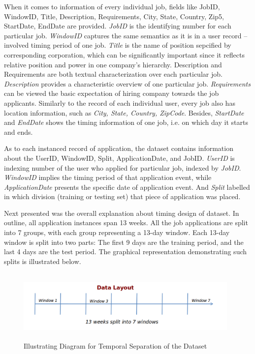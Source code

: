 \documentclass{article} %
\begin{document}
When it comes to information of every individual job, fields like JobID,
WindowID, Title, Description, Requirements, City, State, Country, Zip5,
StartDate, EndDate are provided.
{\it JobID} is the identifying number for each particular job. 
{\it WindowID} captures the same semantics as it is in a user record --
involved timing period of one job.
{\it Title} is the name of position sepcified by corresponding corporation, which
can be significantly important since it reflects relative position and power
in one company's hierarchy. 
Description and Requirements are both textual characterization
over each particular job. 
{\it Description} provides a
characteristic overview of one particular job. 
{\it Requirements} can be
viewed the basic expectation of hiring company towards the job applicants.
Similarly to the record of each individual user, every job also has location
information, such as {\it City, State, Country, ZipCode}. 
Besides, {\it StartDate} and {\it EndDate} shows the timing information of one job,
i.e. on which day it starts and ends. 

As to each instanced record of application, the dataset contains information
about the UserID, WindowID, Split, ApplicationDate, and JobID. 
{\it UserID} is indexing number of the user who applied for particular job,
indexed by {\it JobID}. 
{\it WindowID} implies the timing period of that application event, while
{\it ApplicationDate} presents the specific date of application event. 
And {\it Split} labelled in which division (training or testing set) that
piece of application was placed.

Next presented was the overall explanation about timing design of dataset. In
outline, all application instances span 13 weeks. All the job applications are
split into 7 groups, with each group representing a 13-day window. Each 13-day
window is split into two parts: The first 9 days are the training period, and
the last 4 days are the test period. The graphical representation
demonstrating such splits is illustrated below.
\begin{figure}[h]
    \begin{center}
        \includegraphics[width=4.3in,height=1.4in]{./fig/datalayout.png}
        \caption{Illustrating Diagram for Temporal Separation of the Dataset}
    \end{center}
\end{figure}
\end{document}

